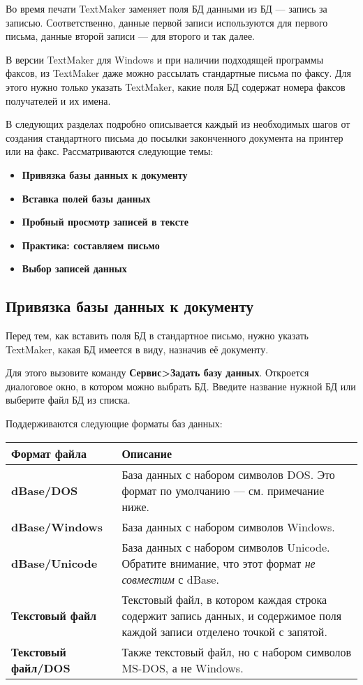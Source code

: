 ﻿\documentclass[a4paper,10pt]{article}
\begin{document}
Во время печати TextMaker заменяет поля БД данными из БД — запись за записью. Соответственно, данные первой записи используются для первого письма, данные второй записи — для второго и так далее.

В версии TextMaker для Windows и при наличии подходящей программы факсов, из TextMaker даже можно рассылать стандартные письма по факсу. Для этого нужно только указать TextMaker, какие поля БД содержат номера факсов получателей и их имена.

В следующих разделах подробно описывается каждый из необходимых шагов от создания стандартного письма до посылки законченного документа на принтер или на факс. Рассматриваются следующие темы:

\begin{itemize}
 \item \textbf{Привязка базы данных к документу}
 \item \textbf{Вставка полей базы данных}
 \item \textbf{Пробный просмотр записей в тексте}
 \item \textbf{Практика: составляем письмо}
 \item \textbf{Выбор записей данных}
\end{itemize}

\subsection{Привязка базы данных к документу}
Перед тем, как вставить поля БД в стандартное письмо, нужно указать TextMaker, какая БД имеется в виду, назначив её документу.

Для этого вызовите команду \textbf{Сервис>Задать базу данных}. Откроется диалоговое окно, в котором можно выбрать БД. Введите название нужной БД или выберите файл БД из списка.

Поддерживаются следующие форматы баз данных:

\begin{center}
\begin{tabular}{  m{4cm}  m{12cm}  }
 \textbf{Формат файла} & \textbf{Описание}\\ 
 \hline
  \textbf{dBase/DOS} & База данных с набором символов DOS. Это формат по умолчанию — см. примечание ниже.\\
  \textbf{dBase/Windows} & База данных с набором символов Windows.\\ 
\textbf{dBase/Unicode} & База данных с набором символов Unicode. Обратите внимание, что этот формат \textit{не совместим} с dBase.\\
\textbf{Текстовый файл} & Текстовый файл, в котором каждая строка содержит запись данных, и содержимое поля каждой записи отделено точкой с запятой.\\
\textbf{Текстовый файл/DOS} & Также текстовый файл, но с набором символов MS-DOS, а не Windows.\\
\end{tabular}
\end{center}
\end{document}
